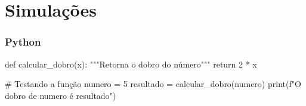 \section{Simulações} %

\begin{frame}[fragile]
    \frametitle{Python}
    
    \begin{python}
def calcular_dobro(x):
    """Retorna o dobro do número"""
    return 2 * x

# Testando a função
numero = 5
resultado = calcular_dobro(numero)
print(f"O dobro de {numero} é {resultado}")
    \end{python}
\end{frame}

